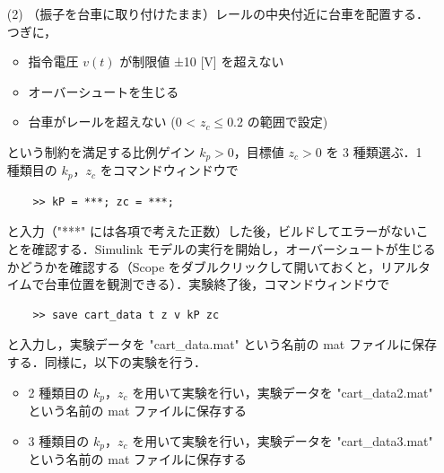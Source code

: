 \begin{enumerate}
  \item[(2)] （振子を台車に取り付けたまま）レールの中央付近に台車を配置する．つぎに，
    \begin{itemize}
      \item 指令電圧 \( v(t) \) が制限値 ±10 [V] を超えない
      \item オーバーシュートを生じる
      \item 台車がレールを超えない (0 < \( z_c \leq 0.2 \) の範囲で設定)
    \end{itemize}
    という制約を満足する比例ゲイン \( k_p > 0 \)，目標値 \( z_c > 0 \) を 3 種類選ぶ．1 種類目の \( k_p \)，\( z_c \) をコマンドウィンドウで
    \begin{tcolorbox}[colback=gray!5!white,colframe=gray!75!black]
      \begin{lstlisting}
    >> kP = ***; zc = ***;
    \end{lstlisting}
    \end{tcolorbox}
    と入力（"***" には各項で考えた正数）した後，ビルドしてエラーがないことを確認する．Simulink モデルの実行を開始し，オーバーシュートが生じるかどうかを確認する（Scope をダブルクリックして開いておくと，リアルタイムで台車位置を観測できる）．実験終了後，コマンドウィンドウで
    \begin{tcolorbox}[colback=gray!5!white,colframe=gray!75!black]
      \begin{lstlisting}
    >> save cart_data t z v kP zc
    \end{lstlisting}
    \end{tcolorbox}
    と入力し，実験データを "cart\_data.mat" という名前の mat ファイルに保存する．同様に，以下の実験を行う．
    \begin{itemize}
      \item 2 種類目の \( k_p \)，\( z_c \) を用いて実験を行い，実験データを "cart\_data2.mat" という名前の mat ファイルに保存する
      \item 3 種類目の \( k_p \)，\( z_c \) を用いて実験を行い，実験データを "cart\_data3.mat" という名前の mat ファイルに保存する
    \end{itemize}
\end{enumerate}

